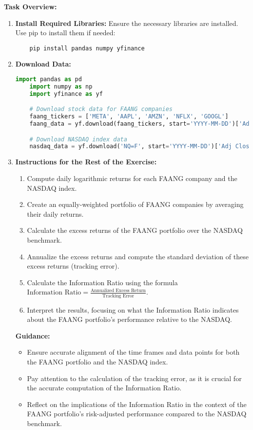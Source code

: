 \documentclass{article}
\begin{document}
\textbf{Task Overview:}
\begin{enumerate}
    \item \textbf{Install Required Libraries:} Ensure the necessary libraries are installed. Use pip to install them if needed:
    \begin{verbatim}
    pip install pandas numpy yfinance
    \end{verbatim}

    \item \textbf{Download Data:}
    \begin{lstlisting}[language=Python]
    import pandas as pd
    import numpy as np
    import yfinance as yf

    # Download stock data for FAANG companies
    faang_tickers = ['META', 'AAPL', 'AMZN', 'NFLX', 'GOOGL']
    faang_data = yf.download(faang_tickers, start='YYYY-MM-DD')['Adj Close']

    # Download NASDAQ index data
    nasdaq_data = yf.download('NQ=F', start='YYYY-MM-DD')['Adj Close']
    \end{lstlisting}

    \item \textbf{Instructions for the Rest of the Exercise:}
    \begin{enumerate}
        \item Compute daily logarithmic returns for each FAANG company and the NASDAQ index.
        \item Create an equally-weighted portfolio of FAANG companies by averaging their daily returns.
        \item Calculate the excess returns of the FAANG portfolio over the NASDAQ benchmark.
        \item Annualize the excess returns and compute the standard deviation of these excess returns (tracking error).
        \item Calculate the Information Ratio using the formula \(\text{Information Ratio} = \frac{\text{Annualized Excess Return}}{\text{Tracking Error}}\).
        \item Interpret the results, focusing on what the Information Ratio indicates about the FAANG portfolio's performance relative to the NASDAQ.
    \end{enumerate}
    
    \textbf{Guidance:}
    \begin{itemize}
        \item Ensure accurate alignment of the time frames and data points for both the FAANG portfolio and the NASDAQ index.
        \item Pay attention to the calculation of the tracking error, as it is crucial for the accurate computation of the Information Ratio.
        \item Reflect on the implications of the Information Ratio in the context of the FAANG portfolio's risk-adjusted performance compared to the NASDAQ benchmark.
    \end{itemize}


\end{enumerate}
\end{document}
